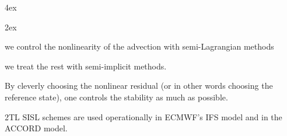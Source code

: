 \documentclass[aspectratio=149,9pt]{beamer}
\begin{document}
\begin{frame}
\begin{myitemize}{4ex}
\begin{minipage}[t][4cm][t]{.6\textwidth}
\begin{myitemize}{2ex}
					\item<3-> we control the nonlinearity of the advection with semi-Lagrangian methods
					\item<4-> we treat the rest with semi-implicit methods.
						\par
						By cleverly choosing the nonlinear residual (or in other words choosing the reference state), one controls the stability as much as possible.
				\end{myitemize}
			\end{minipage}%
		\item <4-> 2TL SISL schemes are used operationally in ECMWF's IFS model and in the ACCORD model.
	\end{myitemize}
\end{frame}
%
%
\end{document}
